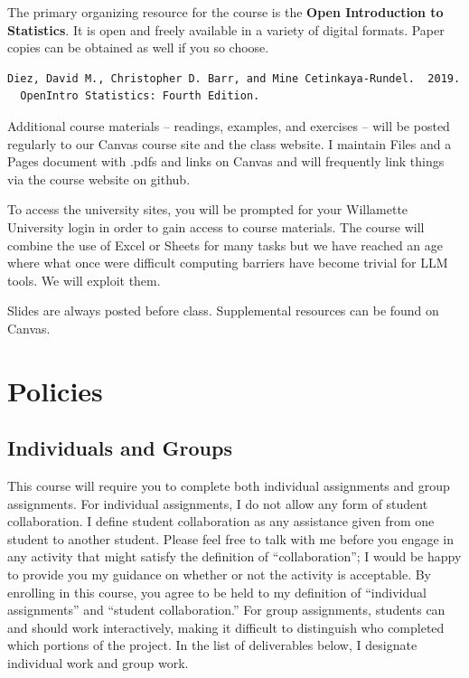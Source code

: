\documentclass[11pt,]{article}
\begin{document}
The primary organizing resource for the course is the \textbf{Open
Introduction to Statistics}. It is open and freely available in a
variety of digital formats. Paper copies can be obtained as well if you
so choose.

\begin{verbatim}
Diez, David M., Christopher D. Barr, and Mine Cetinkaya-Rundel.  2019.  
  OpenIntro Statistics: Fourth Edition.
\end{verbatim}

Additional course materials -- readings, examples, and exercises -- will
be posted regularly to our Canvas course site and the class website. I
maintain Files and a Pages document with .pdfs and links on Canvas and
will frequently link things via the course website on github.

To access the university sites, you will be prompted for your Willamette
University login in order to gain access to course materials. The course
will combine the use of Excel or Sheets for many tasks but we have
reached an age where what once were difficult computing barriers have
become trivial for LLM tools. We will exploit them.

Slides are always posted before class. Supplemental resources can be
found on Canvas.

\section{Policies}\label{policies}

\subsection{Individuals and Groups}\label{individuals-and-groups}

This course will require you to complete both individual assignments and
group assignments. For individual assignments, I do not allow any form
of student collaboration. I define student collaboration as any
assistance given from one student to another student. Please feel free
to talk with me before you engage in any activity that might satisfy the
definition of ``collaboration''; I would be happy to provide you my
guidance on whether or not the activity is acceptable. By enrolling in
this course, you agree to be held to my definition of ``individual
assignments'' and ``student collaboration.'' For group assignments,
students can and should work interactively, making it difficult to
distinguish who completed which portions of the project. In the list of
deliverables below, I designate individual work and group work.
\end{document}
